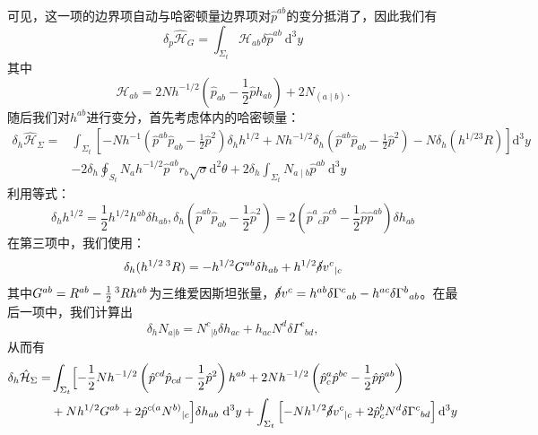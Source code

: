 \documentclass[hyperref, UTF8, a4paper]{ctexart}
\begin{document}
可见，这一项的边界项自动与哈密顿量边界项对$\hat{p}^{ab}$的变分抵消了，因此我们有
\begin{equation*}
	\delta _{p}\hat{\mathcal{H}}_{G} =\int _{\Sigma _{t}}\mathcal{H}_{ab} \delta \hat{p}^{ab} \ \mathrm{d}^{3} y
\end{equation*}
其中
\begin{equation*}
	\boxed{\mathcal{H}_{ab} =2Nh^{-1/2}\left(\hat{p}_{ab} -\frac{1}{2}\hat{p} h_{ab}\right) +2N_{(a\mid b)}} .
\end{equation*}
随后我们对$h^{ab}$进行变分，首先考虑体内的哈密顿量：
\begin{equation*}
	\begin{aligned}
		\delta _{h}\hat{\mathcal{H}}_{\Sigma } = & \int _{\Sigma _{t}}\left[ -Nh^{-1}\left(\hat{p}^{ab}\hat{p}_{ab} -\frac{1}{2}\hat{p}^{2}\right) \delta _{h} h^{1/2} +Nh^{-1/2} \delta _{h}\left(\hat{p}^{ab}\hat{p}_{ab} -\frac{1}{2}\hat{p}^{2}\right) -N\delta _{h}\left( h^{1/23} R\right)\right]\mathrm{d}^{3} y\\
		& -2\delta _{h}\oint _{S_{t}} N_{a} h^{-1/2}\hat{p}^{ab} r_{b}\sqrt{\sigma }\mathrm{d}^{2} \theta +2\delta _{h}\int _{\Sigma _{t}} N_{a\mid b}\hat{p}^{ab} \ \mathrm{d}^{3} y
	\end{aligned}
\end{equation*}
利用等式：
\begin{equation*}
	\delta _{h} h^{1/2} =\frac{1}{2} h^{1/2} h^{ab} \delta h_{ab} ,\delta _{h}\left(\hat{p}^{ab}\hat{p}_{ab} -\frac{1}{2}\hat{p}^{2}\right) =2\left(\hat{p}^{a}{}_{c}\hat{p}^{cb} -\frac{1}{2}\hat{p}\hat{p}^{ab}\right) \delta h_{ab}
\end{equation*}
在第三项中，我们使用：
\begin{equation*}
	\delta _{h} (h^{1/2}\prescript{3}{}{} R)=-h^{1/2} G^{ab} \delta h_{ab} +h^{1/2}\cancel{\delta } v^{c}{}_{|c}
\end{equation*}
其中$G^{ab} =R^{ab} -\frac{1}{2}\prescript{3}{}{} Rh^{ab}$为三维爱因斯坦张量，$\cancel{\delta } v^{c} =h^{ab} \delta \Gamma ^{c}{}_{ab} -h^{ac} \delta \Gamma ^{b}{}_{ab}$。在最后一项中，我们计算出
\begin{equation*}
	\delta _{h} N_{a|b} =N^{c}{}_{|b} \delta h_{ac} +h_{ac} N^{d} \delta \Gamma ^{c}{}_{bd} ,
\end{equation*}
从而有
\begin{equation}
	\begin{aligned}
		\delta _{h}\hat{\mathcal{H}}_{\Sigma } = & \int _{\Sigma _{t}}\Bigl[ -\frac{1}{2} Nh^{-1/2}\left(\hat{p}^{cd}\hat{p}_{cd} -\frac{1}{2}\hat{p}^{2}\right) h^{ab} +2Nh^{-1/2}\left(\hat{p}_{c}^{a}\hat{p}^{bc} -\frac{1}{2}\hat{p}\hat{p}^{ab}\right)\\
		& +Nh^{1/2} G^{ab} +2\hat{p}^{c(a} N^{b)}{}_{|c}\Bigr] \delta h_{ab} \ \mathrm{d}^{3} y+\int _{\Sigma _{t}}\left[ -Nh^{1/2}\cancel{\delta } v^{c}{}_{|c} +2\hat{p}_{c}^{b} N^{d} \delta \Gamma ^{c}{}_{bd}\right]\mathrm{d}^{3} y
	\end{aligned}
	\label{eq:variation_of_induced_metric}
\end{equation}
\end{document}
